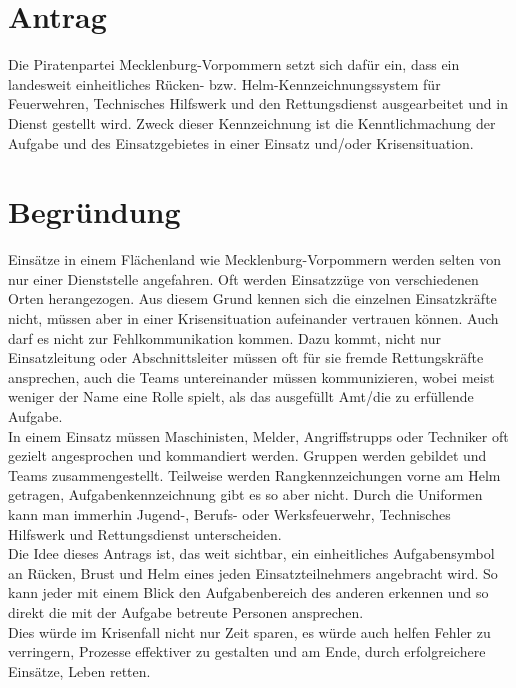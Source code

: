 \section{Antrag}

Die Piratenpartei Mecklenburg-Vorpommern setzt sich dafür ein, dass ein landesweit einheitliches Rücken- bzw. Helm-Kennzeichnungssystem für Feuerwehren, Technisches Hilfswerk und den Rettungsdienst ausgearbeitet und in Dienst gestellt wird. Zweck dieser Kennzeichnung ist die Kenntlichmachung der Aufgabe und des Einsatzgebietes in einer Einsatz und/oder Krisensituation.

\section{Begründung}

Einsätze in einem Flächenland wie Mecklenburg-Vorpommern werden selten von nur einer Dienststelle angefahren. Oft werden Einsatzzüge von verschiedenen Orten herangezogen. Aus diesem Grund kennen sich die einzelnen Einsatzkräfte nicht, müssen aber in einer Krisensituation aufeinander vertrauen können. Auch darf es nicht zur Fehlkommunikation kommen. Dazu kommt, nicht nur Einsatzleitung oder Abschnittsleiter müssen oft für sie fremde Rettungskräfte ansprechen, auch die Teams untereinander müssen kommunizieren, wobei meist weniger der Name eine Rolle spielt, als das ausgefüllt Amt/die zu erfüllende Aufgabe.\\In einem Einsatz müssen Maschinisten, Melder, Angriffstrupps oder Techniker oft gezielt angesprochen und kommandiert werden. Gruppen werden gebildet und Teams zusammengestellt. Teilweise werden Rangkennzeichungen vorne am Helm getragen, Aufgabenkennzeichnung gibt es so aber nicht. Durch die Uniformen kann man immerhin Jugend-, Berufs- oder Werksfeuerwehr, Technisches Hilfswerk und Rettungsdienst unterscheiden.\\Die Idee dieses Antrags ist, das weit sichtbar, ein einheitliches Aufgabensymbol an Rücken, Brust und Helm eines jeden Einsatzteilnehmers angebracht wird. So kann jeder mit einem Blick den Aufgabenbereich des anderen erkennen und so direkt die mit der Aufgabe betreute Personen ansprechen.\\Dies würde im Krisenfall nicht nur Zeit sparen, es würde auch helfen Fehler zu verringern, Prozesse effektiver zu gestalten und am Ende, durch erfolgreichere Einsätze, Leben retten.
